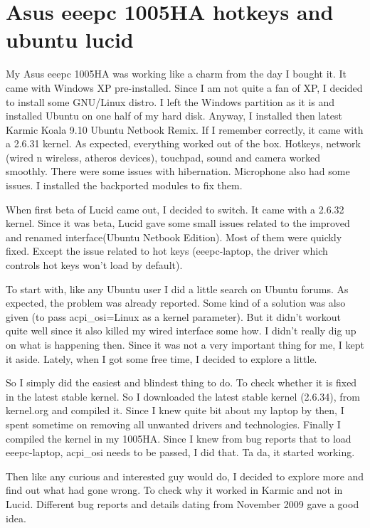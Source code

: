 \section*{Asus eeepc 1005HA hotkeys and ubuntu lucid}
\vskip 2pt

My Asus eeepc 1005HA was working like a charm from the day I bought it. 
It came with Windows XP pre-installed. Since I am not quite a fan of XP, I 
decided to install some GNU/Linux distro. I left the Windows partition as 
it is and installed Ubuntu on one half of my hard disk. Anyway, I installed 
then latest Karmic Koala 9.10 Ubuntu Netbook Remix. If I remember correctly, 
it came with a 2.6.31 kernel. As expected, everything worked out of the box.
 Hotkeys, network (wired n wireless, atheros devices), touchpad, sound and camera 
worked smoothly. There were some issues with hibernation. Microphone also had some 
issues. I installed the backported modules to fix them.

When first beta of Lucid came out, I decided to switch. It came with a 2.6.32 kernel. 
Since it was beta, Lucid gave some small issues related to the improved and renamed 
interface(Ubuntu Netbook Edition). Most of them were quickly fixed. Except the issue 
related to hot keys (eeepc-laptop, the driver which controls hot keys won't load by default).

To start with, like any Ubuntu user I did a little search on Ubuntu forums. As expected, 
the problem was already reported. Some kind of a solution was also given 
(to pass acpi\_osi=Linux as a kernel parameter). But it didn't workout quite well since 
it also killed my wired interface some how. I didn’t really dig up on what is happening 
then. Since it was not a very important thing for me, I kept it aside. Lately, when I 
got some free time, I decided to explore a little.

So I simply did the easiest and blindest thing to do. To check whether it is fixed in the 
latest stable kernel. So I downloaded the latest stable kernel (2.6.34), from kernel.org 
and compiled it. Since I knew quite bit about my laptop by then, I spent sometime on 
removing all unwanted drivers and technologies. Finally I compiled the kernel in my 1005HA. 
Since I knew from bug reports that to load eeepc-laptop, acpi\_osi needs to be passed, 
I did that. Ta da,  it started working.

Then like any curious and interested guy would do, I decided to explore more and find out 
what had gone wrong. To check why it worked in Karmic and not in Lucid. 
Different bug reports and details dating from November 2009 gave a good idea.

